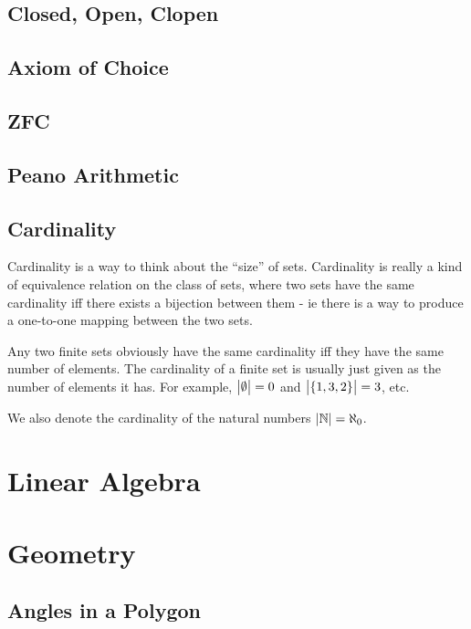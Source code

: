 \documentclass[fleqn,a4paper,11pt]{article}
\begin{document}
    \subsection{Closed, Open, Clopen}

    \subsection{Axiom of Choice}

    \subsection{ZFC}

    \subsection{Peano Arithmetic}

    \subsection{Cardinality}


    Cardinality is a way to think about the ``size'' of sets. Cardinality is
    really a kind of equivalence relation on the class of sets, where two sets
    have the same cardinality iff there exists a bijection between them - ie
    there is a way to produce a one-to-one mapping between the two sets.

    Any two finite sets obviously have the same cardinality iff they have the
    same number of elements. The cardinality of a finite set is usually just
    given as the number of elements it has. For example, \(\abs{\emptyset} = 0\)
    and \(\abs{\set{1, 3, 2}} = 3\), etc.

    We also denote the cardinality of the natural numbers
    \(\abs{\mathbb N} = \aleph_0\).

    \section{Linear Algebra}

    \section{Geometry}

    \subsection{Angles in a Polygon} \label{sec_geom_polygon_angles}
\end{document}

